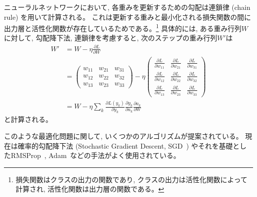 ニューラルネットワークにおいて, 各重みを更新するための勾配は連鎖律 (chain rule) を用いて計算される。
これは更新する重みと最小化される損失関数の間に出力層と活性化関数が存在しているためである。\footnote{損失関数はクラスの出力の関数であり, クラスの出力は活性化関数によって計算され, 活性化関数は出力層の関数である。}
具体的には, ある重み行列$W$に対して, 勾配降下法, 連鎖律を考慮すると, 次のステップの重み行列$W'$は
\begin{equation}
 \begin{split}
  W' &= W - \eta \frac{\partial L}{\partial W}\\
    &=
  \left(
    \begin{array}{ccc}
      w_{11} & w_{21} & w_{31} \\
      w_{12} & w_{22} & w_{32} \\
      w_{13} & w_{23} & w_{33}
    \end{array}
  \right)
  - \eta
  \left(
    \begin{array}{ccc}
      \frac{\partial L}{\partial w_{11}} & \frac{\partial L}{\partial w_{21}} & \frac{\partial L}{\partial w_{31}} \\
      \frac{\partial L}{\partial w_{12}} & \frac{\partial L}{\partial w_{22}} & \frac{\partial L}{\partial w_{32}} \\
      \frac{\partial L}{\partial w_{13}} & \frac{\partial L}{\partial w_{23}} & \frac{\partial L}{\partial w_{33}}
    \end{array}
  \right)\\
    &= W - \eta \sum_k \frac{\partial L (y_k)}{\partial y_k}\frac{\partial y_k}{\partial a_k}\frac{\partial a_k}{\partial W}
 \end{split}
\end{equation}
と計算される。

このような最適化問題に関して, いくつかのアルゴリズムが提案されている。
現在は確率的勾配降下法 (Stochastic Gradient Descent, SGD~\cite{SGD}) やそれを基礎としたRMSProp~\cite{RMSProp}, Adam~\cite{Adam}などの手法がよく使用されている。

